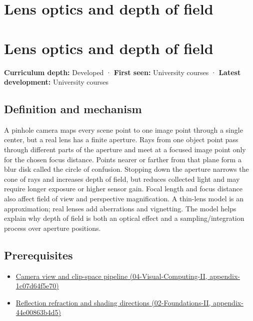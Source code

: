 \hypertarget{appendix-21f8456e2629}{}
\section*{Lens optics and depth of field}
\section{Lens optics and depth of field}\label{appendix-21f8456e2629-lens-optics-and-depth-of-field}

\textbf{Curriculum depth:} Developed · \textbf{First seen:} University courses · \textbf{Latest development:} University courses

\subsection{Definition and mechanism}\label{appendix-21f8456e2629-definition-and-mechanism}

A pinhole camera maps every scene point to one image point through a single center, but a real lens has a finite aperture. Rays from one object point pass through different parts of the aperture and meet at a focused image point only for the chosen focus distance. Points nearer or farther from that plane form a blur disk called the circle of confusion. Stopping down the aperture narrows the cone of rays and increases depth of field, but reduces collected light and may require longer exposure or higher sensor gain. Focal length and focus distance also affect field of view and perspective magnification. A thin-lens model is an approximation; real lenses add aberrations and vignetting. The model helps explain why depth of field is both an optical effect and a sampling/integration process over aperture positions.

\subsection{Prerequisites}\label{appendix-21f8456e2629-prerequisites}

\begin{itemize}
\tightlist
\item
  \href{../04-Visual-Computing-II/main.pdf\#nameddest=appendix-1c07d64f5e70}{Camera view and clip-space pipeline (04-Visual-Computing-II, appendix-1c07d64f5e70)}
\item
  \href{../02-Foundations-II/main.pdf\#nameddest=appendix-44e00863b4d5}{Reflection refraction and shading directions (02-Foundations-II, appendix-44e00863b4d5)}
\end{itemize}

